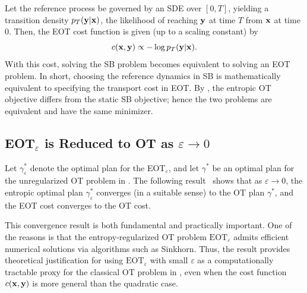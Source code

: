 Let the reference process be governed by an SDE over $[0,T]$, yielding a transition density $p_T({\mathbf{y}}|{\mathbf{x}})$, the likelihood of reaching ${\mathbf{y}}$ at time $T$ from ${\mathbf{x}}$ at time $0$. Then, the EOT cost function is given (up to a scaling constant) by
\[
c({\mathbf{x}}, {\mathbf{y}}) \propto -\log p_T({\mathbf{y}}|{\mathbf{x}}).
\]
With this cost, solving the SB problem becomes equivalent to solving an EOT problem. In short, choosing the reference dynamics in SB is mathematically equivalent to specifying the transport cost in EOT. By , the entropic OT objective differs from the static SB objective; hence the two problems are equivalent and have the same minimizer.





\subsection{EOT$_\varepsilon$ is Reduced to OT as $\varepsilon\to 0$}\label{subsec:eot-ot}


Let $\gamma^*_\varepsilon$ denote the optimal plan for the EOT$_\varepsilon$, and let $\gamma^*$ be an optimal plan for the unregularized OT problem in .  The following result~\citep{mikami2008optimal, peyre2019computational} shows that as $\varepsilon \to 0$, the entropic optimal plan $\gamma^*_\varepsilon$ converges (in a suitable sense) to the OT plan $\gamma^*$, and the EOT cost converges to the OT cost. 



This convergence result is both fundamental and practically important. One of the reasons is that the entropy-regularized OT problem $\mathrm{EOT}_\varepsilon$ admits efficient numerical solutions via algorithms such as Sinkhorn. Thus, the result provides theoretical justification for using $\mathrm{EOT}_\varepsilon$ with small $\varepsilon$ as a computationally tractable proxy for the classical OT problem in , even when the cost function $c({\mathbf{x}}, {\mathbf{y}})$ is more general than the quadratic case.


